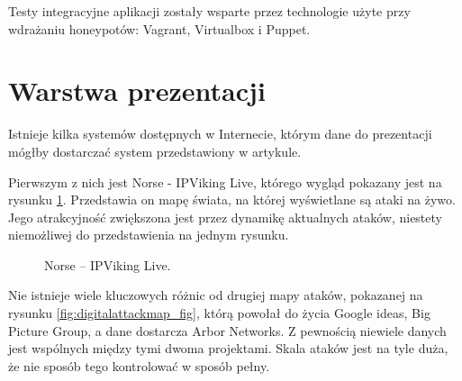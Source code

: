 \documentclass[runningheads,a4paper]{llncs}
\begin{document}
Testy integracyjne aplikacji zostały wsparte przez technologie użyte przy wdrażaniu honeypotów: Vagrant, Virtualbox i Puppet.

\section{Warstwa prezentacji}

Istnieje kilka systemów dostępnych w Internecie, którym dane do prezentacji mógłby dostarczać system przedstawiony w artykule.

Pierwszym z nich jest Norse - IPViking Live, którego wygląd pokazany jest na rysunku \ref{fig:norse_fig}. Przedstawia on mapę świata, na której wyświetlane są ataki na żywo. Jego atrakcyjność zwiększona jest przez dynamikę aktualnych ataków, niestety niemożliwej do przedstawienia na jednym rysunku.

\begin{figure}
        \centering
        \caption{Norse – IPViking Live.}
        \label{fig:norse_fig}
\end{figure}

Nie istnieje wiele kluczowych różnic od drugiej mapy ataków, pokazanej na rysunku \ref{fig:digitalattackmap_fig}, którą powołał do życia Google ideas, Big Picture Group, a dane dostarcza Arbor Networks. Z pewnością niewiele danych jest wspólnych między tymi dwoma projektami. Skala ataków jest na tyle duża, że nie sposób tego kontrolować w sposób pełny.
\end{document}
